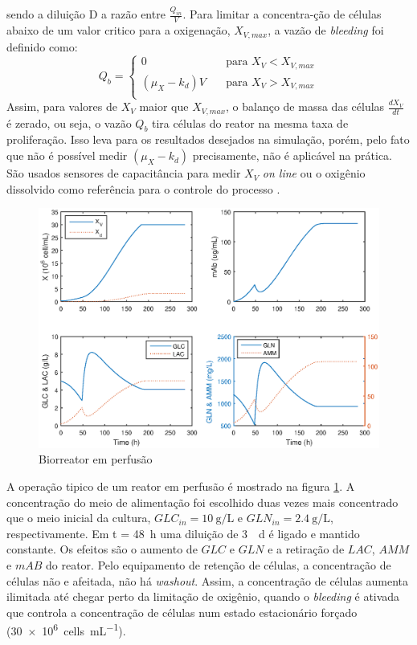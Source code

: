 \documentclass[fleqn,10pt]{SelfArx} %
\begin{document}
sendo a diluição D a razão entre $\frac{Q_{in}}{V}$. Para limitar a concentra-ção de células abaixo de um valor critico para a oxigenação, $X_{V,max}$, a vazão de \textit{bleeding} foi definido como:
\begin{equation}
Q_b =
	\begin{cases}
	0		& \quad \text{para } X_V < X_{V,max} \\
	(\mu _X - k_d)V & \quad \text{para } X_V > X_{V,max} \\
	\end{cases}
\end{equation}
Assim, para valores de $X_V$ maior que $X_{V,max}$, o balanço de massa das células $\frac{dX_V}{dt}$ é zerado, ou seja, o vazão $Q_b$ tira células do reator na mesma taxa de proliferação. Isso leva para os resultados desejados na simulação, porém, pelo fato que não é possível medir $(\mu _X - k_d)$ precisamente, não é aplicável na prática. São usados sensores de capacitância para medir $X_V$ \textit{on line} ou o oxigênio dissolvido como referência para o controle do processo \cite{Justice2011}.

\begin{figure}[ht]\centering
	\includegraphics[width=\linewidth]{model4}
	\caption{Biorreator em perfusão}
	\label{fig:model4}
\end{figure}

A operação tipico de um reator em perfusão é mostrado na figura \ref{fig:model4}. A concentração do meio de alimentação foi escolhido duas vezes mais concentrado que o meio inicial da cultura, $GLC_{in} = \SI{10}{\g\per\L}$ e $GLN_{in} = \SI{2.4}{\g\per\L}$, respectivamente. Em t =  \SI{48}{\hour} uma diluição de \SI{3}{\per\day} é ligado e mantido constante. Os efeitos são o aumento de $GLC$ e $GLN$ e a retiração de $LAC$, $AMM$ e $mAB$ do reator. Pelo equipamento de retenção de células, a concentração de células não e afeitada, não há \textit{washout}. Assim, a concentração de células aumenta ilimitada até chegar perto da limitação de oxigênio, quando o \textit{bleeding} é ativada que controla a concentração de células num estado estacionário forçado (\SI{30e6}{cells\per\mL}).
\end{document}
